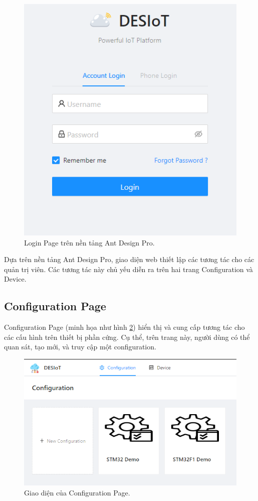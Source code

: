 \begin{figure}[htp]
\centering
\includegraphics[width=0.7\linewidth]{images/fig-adp-default-loginpage.png}
\caption{Login Page trên nền tảng Ant Design Pro.}
\label{fig:adp-default-loginpage}
\end{figure}

Dựa trên nền tảng Ant Design Pro, giao diện web thiết lập các tương tác cho các quản trị viên. Các tương tác này chủ yếu diễn ra trên hai trang Configuration và Device.

\subsection{Configuration Page}

Configuration Page (minh họa như hình \ref{fig:config-page}) hiển thị và cung cấp tương tác cho các cấu hình trên thiết bị phần cứng. Cụ thể, trên trang này, người dùng có thể quan sát, tạo mới, và truy cập một configuration.

\begin{figure}[htp]
\centering
\includegraphics[width=0.7\linewidth]{images/fig-config-page.png}
\caption{Giao diện của Configuration Page.}
\label{fig:config-page}
\end{figure}

